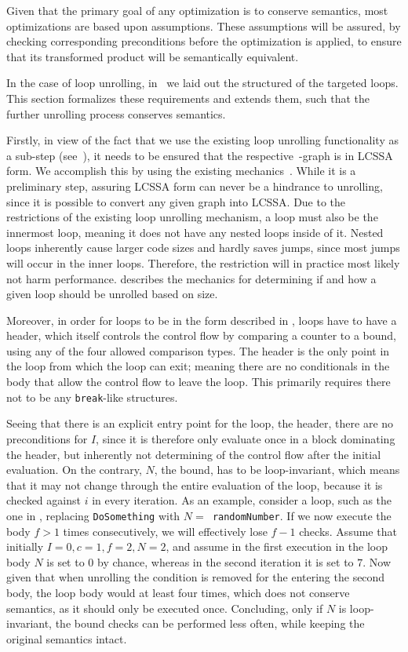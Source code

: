 Given that the primary goal of any optimization is to conserve semantics, most optimizations are based upon assumptions.
These assumptions will be assured, by checking corresponding preconditions before the optimization is applied, to ensure that its transformed product will be semantically equivalent.

In the case of loop unrolling, in~ we laid out the structured of the targeted loops.
This section formalizes these requirements and extends them, such that the further unrolling process conserves semantics.

Firstly, in view of the fact that we use the existing loop unrolling functionality as a sub-step (see~), it needs to be ensured that the respective~\libFIRM-graph is in LCSSA form.
We accomplish this by using the existing mechanics~\cite{aebi18bachelorarbeit}.
While it is a preliminary step, assuring LCSSA form can never be a hindrance to unrolling, since it is possible to convert any given graph into LCSSA.
Due to the restrictions of the existing loop unrolling mechanism, a loop must also be the innermost loop, meaning it does not have any nested loops inside of it.
Nested loops inherently cause larger code sizes and hardly saves jumps, since most jumps will occur in the inner loops.
Therefore, the restriction will in practice most likely not harm performance.
 describes the mechanics for determining if and how a given loop should be unrolled based on size.

Moreover, in order for loops to be in the form described in , loops have to have a header, which itself controls the control flow by comparing a counter to a bound, using any of the four allowed comparison types.
The header is the only point in the loop from which the loop can exit; meaning there are no conditionals in the body that allow the control flow to leave the loop.
This primarily requires there not to be any \texttt{break}-like structures.

Seeing that there is an explicit entry point for the loop, the header, there are no preconditions for $I$, since it is therefore only evaluate once in a block dominating the header, but inherently not determining of the control flow after the initial evaluation.
On the contrary, $N$, the bound, has to be loop-invariant, which means that it may not change through the entire evaluation of the loop, because it is checked against $i$ in every iteration.
As an example, consider a loop, such as the one in , replacing \texttt{DoSomething} with \texttt{$N =$ randomNumber}.
If we now execute the body $f > 1$ times consecutively, we will effectively lose $f - 1$ checks.
Assume that initially $I = 0, c = 1, f = 2, N = 2$, and assume in the first execution in the loop body $N$ is set to $0$ by chance, whereas in the second iteration it is set to $7$.
Now given that when unrolling the condition is removed for the entering the second body, the loop body would at least four times, which does not conserve semantics, as it should only be executed once.
Concluding, only if $N$ is loop-invariant, the bound checks can be performed less often, while keeping the original semantics intact.

